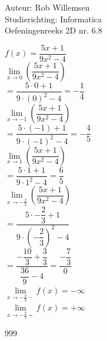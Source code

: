 \documentclass[a4paper]{article}
\begin{document}
\noindent \large Auteur: Rob Willemsen \\
\noindent \large Studierichting: Informatica\\
\noindent \large Oefeningenreeks 2D nr. 6.8\\

\medskip

\normalsize

$f(x) = \dfrac{5x + 1}{9x^2 - 4}$ \\

$\lim\limits_{x \rightarrow 0} \left(\dfrac{5x + 1}{9x^2 - 4}\right)$ \\

$= \dfrac{5 \cdot 0 + 1}{9\cdot(0)^2 - 4} = -\dfrac{1}{4}$ \\

$\lim\limits_{x \rightarrow -1} \left(\dfrac{5x + 1}{9x^2 - 4}\right)$ \\

$= \dfrac{5 \cdot (-1) + 1}{9\cdot(-1)^2 - 4} = -\dfrac{4}{5}$ \\

$\lim\limits_{x \rightarrow 1}  \left(\dfrac{5x + 1}{9x^2 - 4}\right)$ \\

$= \dfrac{5 \cdot 1 + 1}{9\cdot1^2 - 4} = \dfrac{6}{5}$ \\

$\lim\limits_{x \rightarrow -\tfrac{2}{3}}  \left(\dfrac{5x + 1}{9x^2 - 4}\right)$ \\

$= \dfrac{5 \cdot -\dfrac{2}{3} + 1}{9\cdot \left(-\dfrac{2}{3}\right)^2 - 4}$\\

$= \dfrac{-\dfrac{10}{3} + \dfrac{3}{3}}{\dfrac{36}{9} - 4} = \dfrac{-\dfrac{7}{3}}{0}$ \\

$\lim\limits_{x \rightarrow -\tfrac{2}{3}-} f(x) = -\infty$ \\

$\lim\limits_{x \rightarrow -\tfrac{2}{3}+} f(x) = +\infty$ \\

\begin{thebibliography}{999}
\end{thebibliography}
\end{document}
